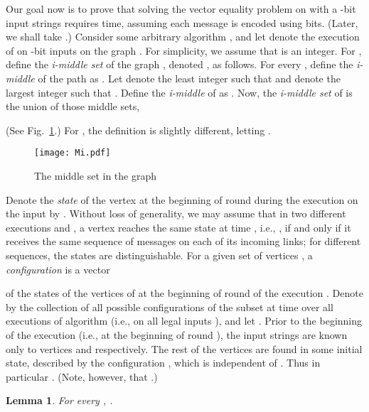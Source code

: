 \documentclass[11pt,letter]{article}
\newtheorem{lemma}[theorem]{Lemma}
\begin{document}
Our goal now is to prove that solving the vector equality problem on  with a -bit input strings  requires
 time, assuming each message is encoded using  bits. (Later, we shall take .)
\newline\indent
Consider some arbitrary algorithm , and let 
denote the execution of  on -bit inputs  on
the graph . For simplicity, we assume that  is an integer. For , 
define the {\em i-middle set}
of the graph , denoted , as follows. For every , define the {\em i-middle} of the path  as
.
Let  denote the least integer  such that
 and  denote the largest integer  such that 
. Define the {\em i-middle} of  as
.
Now, the {\em i-middle set} of  is the union of those middle sets,

(See Fig.~\ref{f:Ti}.)
For , the definition is slightly different, letting
.

\begin{figure} [htb]
\begin{center}

\centerline{\texttt{[image: Mi.pdf]}}

\caption[]{
\label{f:Ti}
\sf
The middle set  in the graph  }
\end{center}
\end{figure}

Denote the {\em state} of the vertex  at the beginning of round 
during the execution  on the input  by
. Without loss of generality, we may assume that in two different executions  and
, a vertex reaches the same state at time
, i.e., , 
if and only if  it receives the same sequence of messages on each of its incoming links; for different sequences, the states are distinguishable.
\newline\indent
For a given set of vertices ,
a {\em configuration}  is a vector

of the states of the vertices of  at the beginning of
round  of the execution .
Denote by  the collection of all possible
configurations of the subset  at time  over all
executions  of algorithm  (i.e., on all legal
inputs ), and let .
\newline\indent
Prior to the beginning of the execution (i.e., at the beginning of
round ), the input strings  are known only to vertices 
 and  respectively. The rest of the vertices
are found in some initial state, described by the configuration
, which is independent of .
Thus in particular .
(Note, however, that .)


\begin{lemma}
\label{step}
For every ,
.
\end{lemma}
\end{document}
